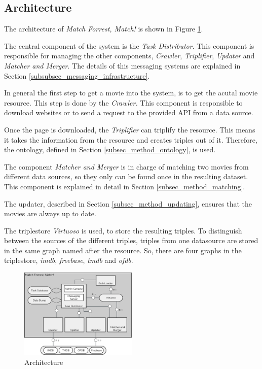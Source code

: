 \subsection{Architecture}
\label{subsec_method_architecture}

The architecture of \emph{Match Forrest, Match!} is shown in Figure \ref{fig_architecture}.


The central component of the system is the \textit{Task Distributor}.
This component is responsible for managing the other components, \textit{Crawler}, \textit{Triplifier}, \textit{Updater} and \textit{Matcher and Merger}.
The details of this messaging systems are explained in Section \ref{subsubsec_messaging_infrastructure}.


In general the first step to get a movie into the system, is to get the acutal movie resource.
This step is done by the \textit{Crawler.}
This component is responsible to download websites or to send a request to the provided API from a data source.

Once the page is downloaded, the \textit{Triplifier} can triplify the resource.
This means it takes the information from the resource and creates triples out of it.
Therefore, the ontology, defined in Section \ref{subsec_method_ontology}, is used.

The component \textit{Matcher and Merger} is in charge of matching two movies from different data sources, so they only can be found once in the resulting dataset.
This component is explained in detail in Section \ref{subsec_method_matching}.

The updater, described in Section \ref{subsec_method_updating}, ensures that the movies are always up to date.

The triplestore \textit{Virtuoso} is used, to store the resulting triples.
To distinguish between the sources of the different triples, triples from one datasource are stored in the same graph named after the resource.
So, there are four graphs in the triplestore, \textit{imdb}, \textit{freebase}, \textit{tmdb} and \textit{ofdb}.

\begin{figure}[ht]
  \begin{center}
  \includegraphics[width=0.5\textwidth]{images/architecture.pdf}
  \end{center}
  \caption{Architecture}
  \label{fig_architecture}
\end{figure}

